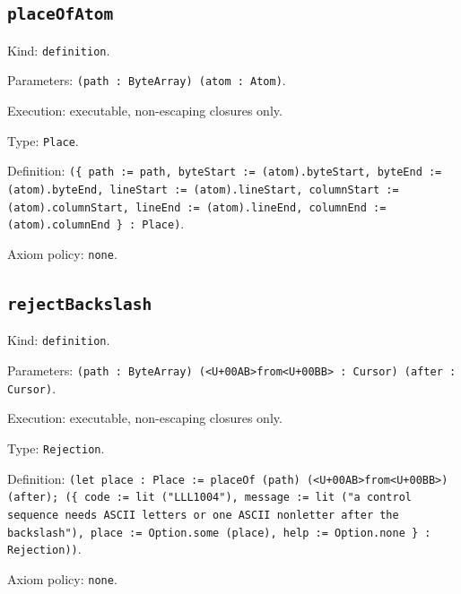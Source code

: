 \documentclass[11pt]{article}
\begin{document}
\subsection*{\texttt{placeOfAtom}}
\noindent Kind: \texttt{definition}.\par
\noindent Parameters: \texttt{(path : ByteArray) (atom : Atom)}.\par
\noindent Execution: executable, non-escaping closures only.\par
\noindent Type: \texttt{Place}.\par
\noindent Definition: \texttt{(\{ path := path, byteStart := (atom).byteStart, byteEnd := (atom).byteEnd, lineStart := (atom).lineStart, columnStart := (atom).columnStart, lineEnd := (atom).lineEnd, columnEnd := (atom).columnEnd \} : Place)}.\par
\noindent Axiom policy: \texttt{none}.\par
\subsection*{\texttt{rejectBackslash}}
\noindent Kind: \texttt{definition}.\par
\noindent Parameters: \texttt{(path : ByteArray) (<U+00AB>from<U+00BB> : Cursor) (after : Cursor)}.\par
\noindent Execution: executable, non-escaping closures only.\par
\noindent Type: \texttt{Rejection}.\par
\noindent Definition: \texttt{(let place : Place := placeOf (path) (<U+00AB>from<U+00BB>) (after); (\{ code := lit ("LLL1004"), message := lit ("a control sequence needs ASCII letters or one ASCII nonletter after the backslash"), place := Option.some (place), help := Option.none \} : Rejection))}.\par
\noindent Axiom policy: \texttt{none}.\par
\end{document}
